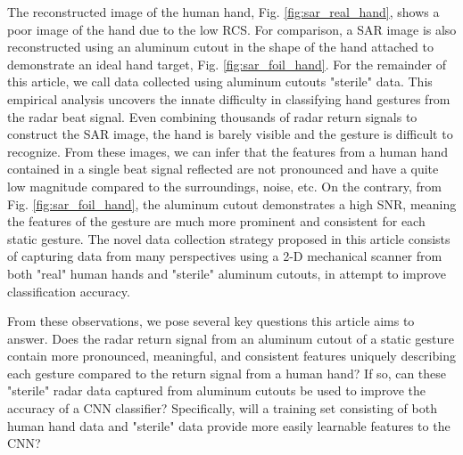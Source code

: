 \documentclass{ieeeaccess}
\begin{document}
The reconstructed image of the human hand, Fig. \ref{fig:sar_real_hand}, shows a poor image of the hand due to the low RCS. For comparison, a SAR image is also reconstructed using an aluminum cutout in the shape of the hand attached to demonstrate an ideal hand target, Fig. \ref{fig:sar_foil_hand}. For the remainder of this article, we call data collected using aluminum cutouts "sterile" data. This empirical analysis uncovers the innate difficulty in classifying hand gestures from the radar beat signal. Even combining thousands of radar return signals to construct the SAR image, the hand is barely visible and the gesture is difficult to recognize. From these images, we can infer that the features from a human hand contained in a single beat signal reflected are not pronounced and have a quite low magnitude compared to the surroundings, noise, etc. On the contrary, from Fig. \ref{fig:sar_foil_hand}, the aluminum cutout demonstrates a high SNR, meaning the features of the gesture are much more prominent and consistent for each static gesture. The novel data collection strategy proposed in this article consists of capturing data from many perspectives using a 2-D mechanical scanner from both "real" human hands and "sterile" aluminum cutouts, in attempt to improve classification accuracy.

From these observations, we pose several key questions this article aims to answer. Does the radar return signal from an aluminum cutout of a static gesture contain more pronounced, meaningful, and consistent features uniquely describing each gesture compared to the return signal from a human hand? If so, can these "sterile" radar data captured from aluminum cutouts be used to improve the accuracy of a CNN classifier? Specifically, will a training set consisting of both human hand data and "sterile" data provide more easily learnable features to the CNN?
\end{document}

